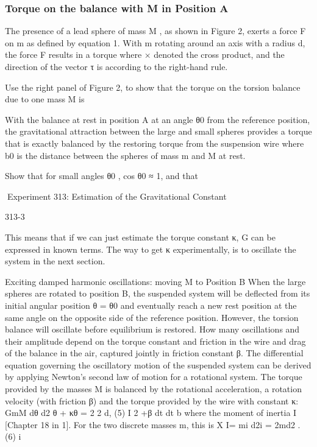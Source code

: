 \documentclass{beamer}
\begin{document}
\begin{frame}
\frametitle{Torque on the balance with M in Position A}
The presence of a lead sphere of mass M , as shown in Figure 2, exerts a force
F on m as defined by equation 1.  With m rotating around an axis with a radius
d, the force F results in a torque where × denoted the cross product, and the
direction of the vector τ is according to the right-hand rule.

\begin{check}
Use the right panel of Figure 2, to show that the torque on the torsion balance
due to one mass M is
\end{check}

With the balance at rest in position A at an angle θ0 from the reference
position, the gravitational attraction between the large and small spheres
provides a torque that is exactly balanced by the restoring torque from the
suspension wire where b0 is the distance between the spheres of mass m and M at
rest.

\begin{check}
Show that for small angles θ0 , cos θ0 ≈ 1, and that
\end{check}

Experiment 313: Estimation of the Gravitational Constant

313-3

This means that if we can just estimate the torque constant κ, G can be expressed in known terms. The
way to get κ experimentally, is to oscillate the system in the next section.

Exciting damped harmonic oscillations: moving M to Position B
When the large spheres are rotated to position B, the suspended system will be deflected from its initial
angular position θ = θ0 and eventually reach a new rest position at the same angle on the opposite side
of the reference position. However, the torsion balance will oscillate before equilibrium is restored. How
many oscillations and their amplitude depend on the torque constant and friction in the wire and drag of
the balance in the air, captured jointly in friction constant β.
The differential equation governing the oscillatory motion of the suspended system can be derived by applying
Newton’s second law of motion for a rotational system. The torque provided by the masses M is balanced
by the rotational acceleration, a rotation velocity (with friction β) and the torque provided by the wire with
constant κ:
GmM
dθ
d2 θ
+ κθ = 2 2 d,
(5)
I 2 +β
dt
dt
b
where the moment of inertia I [Chapter 18 in 1]. For the two discrete masses m, this is
X
I=
mi d2i = 2md2 .
(6)
i


\end{frame}
\end{document}
